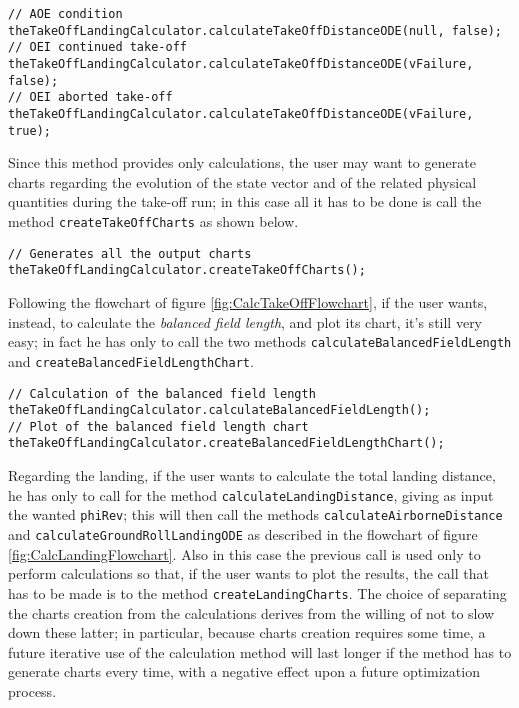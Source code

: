 \bigskip
\begin{lstlisting}[caption={Possible scenarios of calculation of the take-off distance}, captionpos=b, tabsize=2, label={lst:TakeOffScenarios}]
// AOE condition
theTakeOffLandingCalculator.calculateTakeOffDistanceODE(null, false); 
// OEI continued take-off
theTakeOffLandingCalculator.calculateTakeOffDistanceODE(vFailure, false); 
// OEI aborted take-off
theTakeOffLandingCalculator.calculateTakeOffDistanceODE(vFailure, true); 
\end{lstlisting}
%
Since this method provides only calculations, the user may want to generate charts regarding the evolution of the state vector and of the related physical quantities during the take-off run; in this case all it has to be done is call the method \lstinline[language=Java]!createTakeOffCharts! as shown below.

\bigskip
\begin{lstlisting}[caption={Take-off charts creation}, captionpos=b, tabsize=2]
// Generates all the output charts
theTakeOffLandingCalculator.createTakeOffCharts();
\end{lstlisting}
%
Following the flowchart of figure \ref{fig:CalcTakeOffFlowchart}, if the user wants, instead, to calculate the \emph{balanced field length}, and plot its chart, it's still very easy; in fact he has only to call the two methods \lstinline[language=Java]!calculateBalancedFieldLength! and \lstinline[language=Java]!createBalancedFieldLengthChart!.

\bigskip
\begin{lstlisting}[caption={Balanced field length calculation and plot}, captionpos=b, tabsize=2]
// Calculation of the balanced field length
theTakeOffLandingCalculator.calculateBalancedFieldLength();
// Plot of the balanced field length chart
theTakeOffLandingCalculator.createBalancedFieldLengthChart();
\end{lstlisting}
%
Regarding the landing, if the user wants to calculate the total landing distance, he has only to call for the method \lstinline[language=Java]!calculateLandingDistance!, giving as input the wanted \lstinline[language=Java]!phiRev!; this will then call the methods \lstinline[language=Java]!calculateAirborneDistance! and \lstinline[language=Java]!calculateGroundRollLandingODE! as described in the flowchart of figure \ref{fig:CalcLandingFlowchart}. Also in this case the previous call is used only to perform calculations so that, if the user wants to plot the results, the call that has to be made is to the method \lstinline[language=Java]!createLandingCharts!. The choice of separating the charts creation from the calculations derives from the willing of not to slow down these latter; in particular, because charts creation requires some time, a future iterative use of the calculation method will last longer if the method has to generate charts every time, with a negative effect upon a future optimization process.


